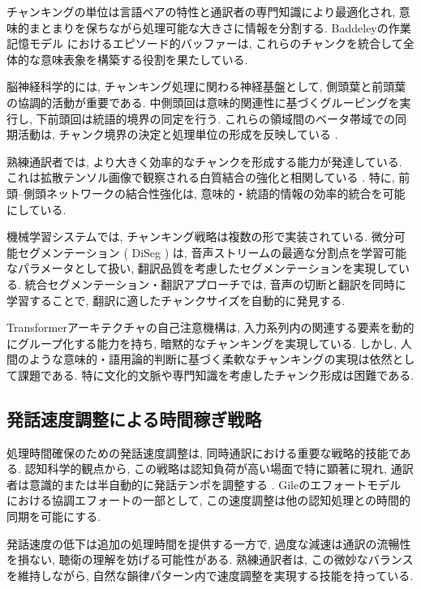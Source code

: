 チャンキングの単位は言語ペアの特性と通訳者の専門知識により最適化され, 意味的まとまりを保ちながら処理可能な大きさに情報を分割する.
Baddeleyの作業記憶モデル \cite{baddeley2000episodic} におけるエピソード的バッファーは, これらのチャンクを統合して全体的な意味表象を構築する役割を果たしている.

脳神経科学的には, チャンキング処理に関わる神経基盤として, 側頭葉と前頭葉の協調的活動が重要である.
中側頭回は意味的関連性に基づくグルーピングを実行し, 下前頭回は統語的境界の同定を行う.
これらの領域間のベータ帯域での同期活動は, チャンク境界の決定と処理単位の形成を反映している \cite{elmer2016functional}.

熟練通訳者では, より大きく効率的なチャンクを形成する能力が発達している.
これは拡散テンソル画像で観察される白質結合の強化と相関している \cite{vandeputte2018anatomical}.
特に, 前頭--側頭ネットワークの結合性強化は, 意味的・統語的情報の効率的統合を可能にしている.

機械学習システムでは, チャンキング戦略は複数の形で実装されている.
微分可能セグメンテーション ( DiSeg ) \cite{zhang2023diseg} は, 音声ストリームの最適な分割点を学習可能なパラメータとして扱い, 翻訳品質を考慮したセグメンテーションを実現している.
統合セグメンテーション・翻訳アプローチでは, 音声の切断と翻訳を同時に学習することで, 翻訳に適したチャンクサイズを自動的に発見する.

Transformerアーキテクチャの自己注意機構は, 入力系列内の関連する要素を動的にグループ化する能力を持ち, 暗黙的なチャンキングを実現している.
しかし, 人間のような意味的・語用論的判断に基づく柔軟なチャンキングの実現は依然として課題である.
特に文化的文脈や専門知識を考慮したチャンク形成は困難である.

\subsection{発話速度調整による時間稼ぎ戦略}

処理時間確保のための発話速度調整は, 同時通訳における重要な戦略的技能である.
認知科学的観点から, この戦略は認知負荷が高い場面で特に顕著に現れ, 通訳者は意識的または半自動的に発話テンポを調整する \cite{mizuno2005process}.
Gileのエフォートモデル \cite{gile1995basic} における協調エフォートの一部として, この速度調整は他の認知処理との時間的同期を可能にする.

発話速度の低下は追加の処理時間を提供する一方で, 過度な減速は通訳の流暢性を損ない, 聴衛の理解を妨げる可能性がある.
熟練通訳者は, この微妙なバランスを維持しながら, 自然な韻律パターン内で速度調整を実現する技能を持っている.

